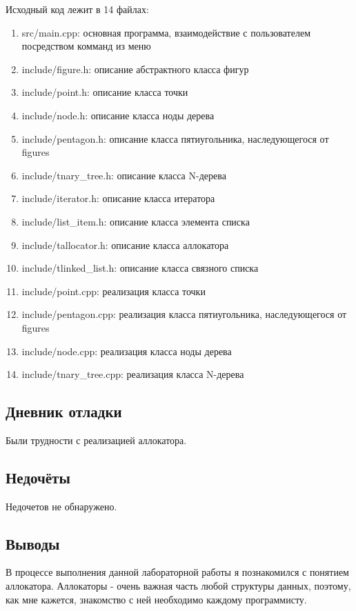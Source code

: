\documentclass[12pt]{article}
\begin{document}
Исходный код лежит в 14 файлах:
\begin{enumerate}
\item src/main.cpp: основная программа, взаимодействие с пользователем посредством комманд из меню

\item include/figure.h:    описание абстрактного класса фигур

\item include/point.h:     описание класса точки
\item include/node.h:  описание класса ноды дерева
\item include/pentagon.h: описание класса пятиугольника, наследующегося от figures
\item include/tnary\_tree.h:    описание класса N-дерева
\item include/iterator.h:    описание класса итератора
\item include/list\_item.h:    описание класса элемента списка
\item include/tallocator.h:    описание класса аллокатора
\item include/tlinked\_list.h:    описание класса связного списка

\item include/point.cpp:     реализация класса точки
\item include/pentagon.cpp:  реализация класса пятиугольника, наследующегося от figures
\item include/node.cpp: реализация класса ноды дерева
\item include/tnary\_tree.cpp:    реализация класса N-дерева

\end{enumerate}

\subsection*{Дневник отладки}
Были трудности с реализацией аллокатора.

\subsection*{Недочёты}
Недочетов не обнаружено.

\subsection*{Выводы}
В процессе выполнения данной лабораторной работы я познакомился с понятием аллокатора. Аллокаторы - очень важная часть любой структуры данных, поэтому, как мне кажется, знакомство с ней необходимо каждому программисту.
\end{document}
